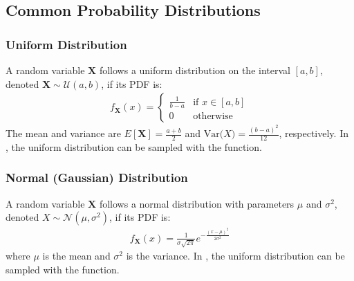 \documentclass[letterpaper,10pt,english]{jupyterBook}
\begin{document}
\subsection{Common Probability Distributions}
\label{\detokenize{01:common-probability-distributions}}

\subsubsection{Uniform Distribution}
\label{\detokenize{01:uniform-distribution}}
\sphinxAtStartPar
A random variable \(\mathbf X\) follows a uniform distribution on the interval \([a, b]\), denoted \(\mathbf X \sim \mathcal{U}(a, b)\), if its PDF is:
\begin{equation*}
\begin{split}
    f_{\mathbf X}(x) = \begin{cases}
    \frac{1}{b - a} & \text{if } x \in [a, b] \\
    0 & \text{otherwise}
    \end{cases}
\end{split}
\end{equation*}
\sphinxAtStartPar
The mean and variance are \(E[\mathbf X] = \frac{a + b}{2}\) and \(\text{Var}\mathbf (X) = \frac{(b - a)^2}{12}\), respectively.
In , the uniform distribution can be sampled with the  function.


\subsubsection{Normal (Gaussian) Distribution}
\label{\detokenize{01:normal-gaussian-distribution}}
\sphinxAtStartPar
A random variable \(\mathbf X\) follows a normal distribution with parameters \(\mu\) and \(\sigma^2\), denoted \(X \sim \mathcal{N}(\mu, \sigma^2)\), if its PDF is:
\begin{equation*}
\begin{split}
    f_{\mathbf X}(x) = \frac{1}{\sigma\sqrt{2\pi}} e^{-\frac{(x-\mu)^2}{2\sigma^2}}
\end{split}
\end{equation*}
\sphinxAtStartPar
where \(\mu\) is the mean and \(\sigma^2\) is the variance.
In , the uniform distribution can be sampled with the  function.
\end{document}
